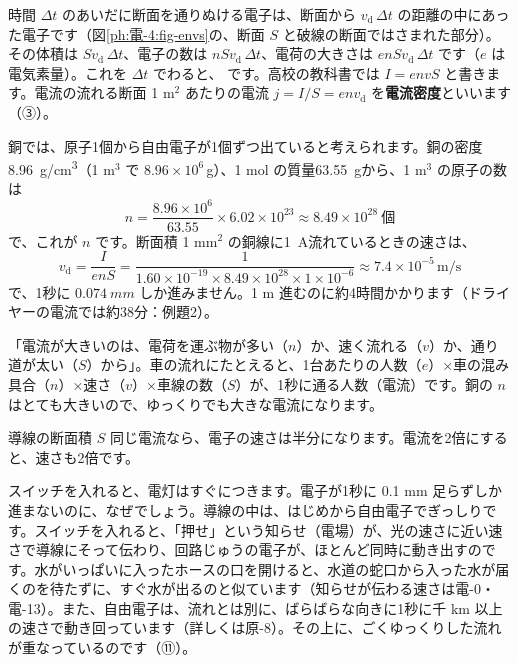 \noindent 時間 $\Delta t$ のあいだに断面を通りぬける電子は、断面から $v_{\mathrm d}\,\Delta t$ の距離の中にあった電子です（図\ref{ph:電-4:fig-envs}の、断面 $S$ と破線の断面ではさまれた部分）。その体積は $Sv_{\mathrm d}\,\Delta t$、電子の数は $nSv_{\mathrm d}\,\Delta t$、電荷の大きさは $enSv_{\mathrm d}\,\Delta t$ です（$e$ は電気素量）。これを $\Delta t$ でわると、
\label{ph:電-4:envs}です。高校の教科書では $I=envS$ と書きます。電流の流れる断面 1 m$^2$ あたりの電流 $j=I/S=env_{\mathrm d}$ を\textbf{電流密度}といいます（③）。

銅では、原子1個から自由電子が1個ずつ出ていると考えられます。銅の密度 \qty{8.96}{g/cm^3}（1 m$^3$ で $8.96\times10^6$\,g）、1 mol の質量\qty{63.55}{g}から、1 m$^3$ の原子の数は
\[n=\frac{8.96\times10^6}{63.55}\times6.02\times10^{23}\approx8.49\times10^{28}\ \text{個}\]
で、これが $n$ です。断面積 1 mm$^2$ の銅線に\qty{1}{A}流れているときの速さは、
\[v_{\mathrm d}=\frac{I}{enS}=\frac{1}{1.60\times10^{-19}\times8.49\times10^{28}\times1\times10^{-6}}\approx7.4\times10^{-5}\,\text{m/s}\]
で、1秒に $\qty{0.074}{mm}$ しか進みません。1 m 進むのに約4時間かかります（ドライヤーの電流では約38分：例題2）。

\begin{phyomi}[$I=envS$]
「電流が大きいのは、電荷を運ぶ物が多い（$n$）か、速く流れる（$v$）か、通り道が太い（$S$）から」。車の流れにたとえると、1台あたりの人数（$e$）×車の混み具合（$n$）×速さ（$v$）×車線の数（$S$）が、1秒に通る人数（電流）です。銅の $n$ はとても大きいので、ゆっくりでも大きな電流になります。
\end{phyomi}

\begin{phbaisuru}{導線の断面積 $S$}
同じ電流なら、電子の速さは半分になります。電流を2倍にすると、速さも2倍です。
\end{phbaisuru}

スイッチを入れると、電灯はすぐにつきます。電子が1秒に 0.1 mm 足らずしか進まないのに、なぜでしょう。導線の中は、はじめから自由電子でぎっしりです。スイッチを入れると、「押せ」という知らせ（電場）が、光の速さに近い速さで導線にそって伝わり、回路じゅうの電子が、ほとんど同時に動き出すのです。水がいっぱいに入ったホースの口を開けると、水道の蛇口から入った水が届くのを待たずに、すぐ水が出るのと似ています（知らせが伝わる速さは電-0・電-13）。また、自由電子は、流れとは別に、ばらばらな向きに1秒に千 km 以上の速さで動き回っています（詳しくは原-8）。その上に、ごくゆっくりした流れが重なっているのです（⑪）。

